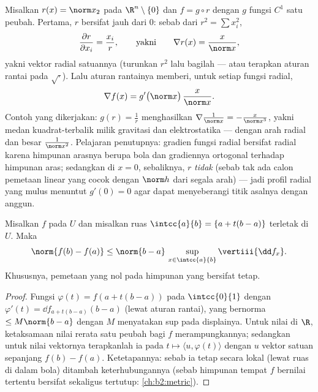 \begin{example}\label{ex:b2:diffcalc:radial}
Misalkan $r(x) = \norm x_2$ pada $\R^n\setminus\{0\}$ dan $f = g \circ
r$ dengan $g$ fungsi $C^1$ satu peubah. Pertama, $r$ bersifat
 jauh dari $0$: sebab dari $r^2 = \sum x_i^2$,
\[
\frac{\partial r}{\partial x_i} = \frac{x_i}{r},
\qquad\text{yakni}\qquad
\nabla r(x) = \frac{x}{\norm x} ,
\]
yakni vektor radial satuannya (turunkan $r^2$ lalu bagilah --- atau
terapkan aturan rantai pada $\sqrt{\cdot}$). Lalu aturan rantainya
memberi, untuk setiap fungsi radial,
\[
\nabla f(x) = g'\bigl(\norm x\bigr)\,\frac{x}{\norm x} .
\]
Contoh yang dikerjakan: $g(r) = \frac1r$ menghasilkan $\nabla\frac{1}{\norm
x} = -\frac{x}{\norm x^3}$, yakni medan kuadrat-terbalik milik
gravitasi dan elektrostatika --- dengan arah radial dan besar
$\frac{1}{\norm x^2}$. Pelajaran penutupnya: gradien fungsi
radial bersifat radial karena himpunan arasnya berupa bola dan
gradiennya ortogonal terhadap himpunan aras; sedangkan di $x = 0$,
sebaliknya, $r$ \emph{tidak}  (sebab tak ada calon
pemetaan linear yang cocok dengan $\norm h$ dari segala arah) --- jadi
profil radial yang mulus menuntut $g'(0) = 0$ agar dapat menyeberangi titik asalnya
dengan anggun.
\end{example}

\begin{theorem}\label{thm:b2:diffcalc:mvi}
Misalkan $f$  pada $U$ dan misalkan ruas $\intcc{a}{b}
= \{a + t(b-a)\}$ terletak di $U$. Maka
\[
\norm{f(b) - f(a)} \leq \norm{b - a}\,
\sup_{x \in \intcc{a}{b}} \vertiii{\dd f_x} .
\]
Khususnya, pemetaan  yang  nol pada himpunan
 yang \emph{} bersifat tetap.
\end{theorem}

\begin{proof}
Fungsi $\varphi(t) = f(a + t(b-a))$  pada
$\intcc{0}{1}$ dengan $\varphi'(t) = \dd f_{a + t(b-a)}(b - a)$
(lewat aturan rantai), yang bernorma $\leq M\norm{b-a}$ dengan $M$ menyatakan
sup pada displainya. Untuk nilai di $\R$, ketaksamaan nilai rerata satu peubah bagi $f$
merampungkannya; sedangkan untuk nilai vektornya terapkanlah ia pada $t \mapsto \langle u,
\varphi(t)\rangle$ dengan $u$ vektor satuan sepanjang $f(b) - f(a)$.
Ketetapannya: sebab ia tetap secara lokal (lewat ruas di dalam bola) ditambah keterhubungannya
(sebab himpunan tempat $f$ bernilai tertentu bersifat  sekaligus tertutup:
\cref{ch:b2:metric}).
\end{proof}

